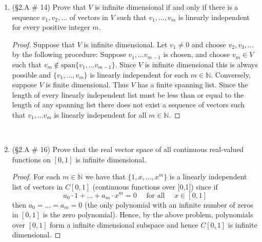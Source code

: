 \documentclass[12pt,letterpaper]{article}
\theoremstyle{plain}
\theoremstyle{definition}
\begin{document}
\begin{enumerate}[1.]
\begin{proof}
Conversely, suppose each $v\in V$ has a unique representation in the form 
\[v=u_1+\ldots +u_n\quad \text{where each}\quad u_i\in U_i\neq \{0\}.\]
Parts (a) and (c) are automatically satisfied. We need to show part (b) of the the definition holds. If
\[w\in U_i\]
and 
\[w\in U_1+\ldots +U_{i-1}+U_{i+1}+\ldots U_n\]
for some $i\in \{1,\ldots, n\}$ then, 
\[0=w_1+\ldots w_{i-1}+w+w_{i+1}+\ldots +w_n\]
where each $w_j\in U_j$ for $j\in \{1,\ldots i-1\}\cup \{i+1, \ldots n\}$. By the unique representation of $0$ we have that 
\[w_1=\ldots w_{i-1}=w=w_{i+1}=\ldots =w_n=0.\]
Hence (b) is satisfied.
\end{proof}
\ \\
\item (\S 2.A \# 14) Prove that $V$ is infinite dimensional if and only if there is a sequence $v_1, v_2, \ldots $ of vectors in $V$ such that $v_1, \ldots ,v_m$ is linearly independent for every positive integer $m$. 
\begin{proof} Suppose that $V$ is infinite dimensional. Let $v_1\neq 0$ and choose $v_2, v_3, \ldots $ by the following procedure:
Suppose $v_1, \ldots v_{m-1}$ is chosen, and choose $v_m\in V$ such that $v_m\not\in \text{span}\{v_1, \ldots v_{m-1}\}$. Since $V$ is infinite dimensional this is always possible and $\{v_1, \ldots ,v_m\}$ is linearly independent for each $m\in \mathbb{N}$. Conversely, suppose $V$ is finite dimensional. Thus $V$ has a finite spanning list. Since the length of every linearly independent list must be less than or equal to the length of any spanning list there does not exist a sequence of vectors such that $v_1, \ldots v_m$ is linearly independent for all $m\in \mathbb{N}$.
\end{proof}
\ \\
\item (\S 2.A \# 16) Prove that the real vector space of all continuous real-valued functions on $[0,1]$ is infinite dimensional. 
\begin{proof} For each $m\in \mathbb{N}$ we have that $\{1, x, \ldots , x^m\}$ is a linearly independent list of vectors in $C[0,1]$ (continuous functions over [0,1]) since if 
\[a_0\cdot 1+\ldots+a_m\cdot x^m=0 \quad\text{ for all }\quad x\in [0,1]\]
then $a_0=\ldots =a_m=0$ (the only polynomial with an infinite number of zeros in $[0,1]$ is the zero polynomial). Hence, by the above problem, polynomials over $[0,1]$ form a infinite dimensional subspace and hence $C[0,1]$ is infinite dimensional.
\end{proof}
\ \\

\end{enumerate}
\end{document}
